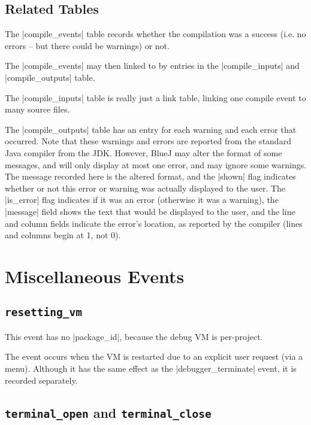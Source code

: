 \documentclass{book}
\begin{document}
\subsection{Related Tables}

The |compile_events| table records whether the compilation was a success
(i.e. no errors -- but there could be warnings) or not.


The |compile_events| may then linked to by entries in the |compile_inputs| and
|compile_outputs| table.

The |compile_inputs| table is really just a link table, linking one compile
event to many source files.


The |compile_outputs| table has an entry for each warning and each error that
occurred.  Note that these warnings and errors are reported from the standard Java
compiler from the JDK.  However, BlueJ may alter the format of some messages,
and will only display at most one error, and may ignore some warnings.  The
message recorded here is the altered format, and the |shown| flag indicates
whether or not this error or warning was actually displayed to the user.  The
|is_error| flag indicates if it was an error (otherwise it was a warning), the
|message| field shows the text that would be displayed to the user, and the
line and column fields indicate the error's location, as reported by the
compiler  (lines and columns begin at 1, not 0).


\section{Miscellaneous Events}

\subsection{\lstinline|resetting_vm|}

This event has no |package_id|, because the debug VM is per-project.

The event occurs when the VM is restarted due to an explicit user request (via
a menu).  Although it has the same effect as the |debugger_terminate| event,
it is recorded separately.

\subsection{\lstinline|terminal_open| and \lstinline|terminal_close|}
\end{document}
